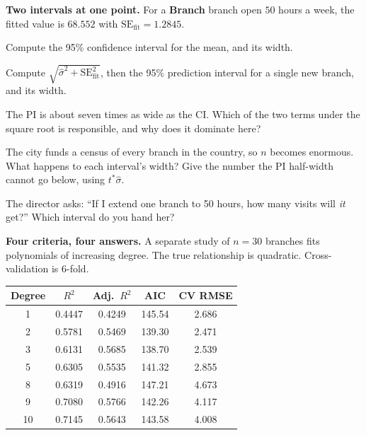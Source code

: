 \documentclass[11pt]{article}
\newcommand{\answerspace}[1]{\vspace{#1}}
\begin{document}
\begin{questions}
\item \textbf{Two intervals at one point.} For a \textbf{Branch} branch open $50$ hours a week, the
fitted value is $68.552$ with $\text{SE}_{\text{fit}} = 1.2845$.

\begin{parts}
\item Compute the 95\% confidence interval for the mean, and its width.
\answerspace{4em}

\item Compute $\sqrt{\hat\sigma^2 + \text{SE}_{\text{fit}}^2}$, then the 95\% prediction interval
for a single new branch, and its width.
\answerspace{4.5em}

\item The PI is about seven times as wide as the CI. Which of the two terms under the square root
is responsible, and why does it dominate here?
\answerspace{4em}

\item The city funds a census of every branch in the country, so $n$ becomes enormous. What happens
to each interval's width? Give the number the PI half-width cannot go below, using
$t^{\ast}\hat\sigma$.
\answerspace{4.5em}

\item The director asks: ``If I extend one branch to 50 hours, how many visits will \emph{it} get?''
Which interval do you hand her?
\answerspace{3em}
\end{parts}

\item \textbf{Four criteria, four answers.} A separate study of $n = 30$ branches fits polynomials
of increasing degree. The true relationship is quadratic. Cross-validation is 6-fold.

\begin{center}
\renewcommand{\arraystretch}{1.25}
\begin{tabular}{ccccc}
\toprule
\textbf{Degree} & \textbf{$R^2$} & \textbf{Adj.\ $R^2$} & \textbf{AIC} & \textbf{CV RMSE} \\
\midrule
1 & 0.4447 & 0.4249 & 145.54 & 2.686 \\
2 & 0.5781 & 0.5469 & 139.30 & 2.471 \\
3 & 0.6131 & 0.5685 & 138.70 & 2.539 \\
5 & 0.6305 & 0.5535 & 141.32 & 2.855 \\
8 & 0.6319 & 0.4916 & 147.21 & 4.673 \\
9 & 0.7080 & 0.5766 & 142.26 & 4.117 \\
10 & 0.7145 & 0.5643 & 143.58 & 4.008 \\
\bottomrule
\end{tabular}
\end{center}


\end{questions}
\end{document}
